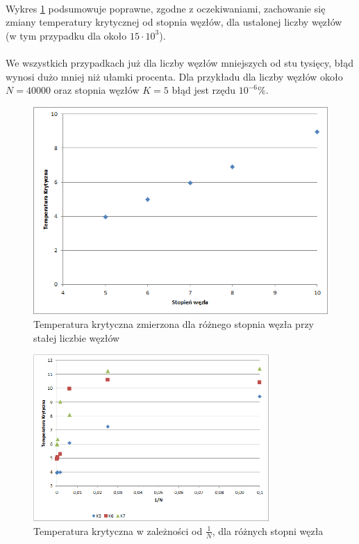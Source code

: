 \documentclass[12pt,a4paper]{article}
\begin{document}
\paragraph{}
Wykres \ref{fig:TcOdK} podsumowuje poprawne, zgodne z oczekiwaniami, zachowanie się zmiany temperatury krytycznej od stopnia węzłów, dla ustalonej liczby węzłów (w tym przypadku dla około $15 \cdot 10^3$). 
\paragraph{}
We wszystkich przypadkach już dla liczby węzłów mniejszych  od stu tysięcy, błąd wynosi dużo mniej niż ułamki procenta. Dla przykładu dla liczby węzłów około $N = 40000$ oraz stopnia węzłów $K=5$ błąd jest rzędu $10^{-6}\%$. 

\begin{figure}
\includegraphics[width=\textwidth]{TodK.png}
\caption{Temperatura krytyczna zmierzona dla różnego stopnia węzła przy stałej liczbie węzłów}
\label{fig:TcOdK}
\end{figure}

\begin{figure}
\includegraphics[width=0.8\textwidth]{K5K6K7.png}
\caption{Temperatura krytyczna w zależności od $\frac{1}{N}$, dla różnych stopni węzła}
\label{fig:TcOd1/N.1}
\end{figure}
\end{document}
